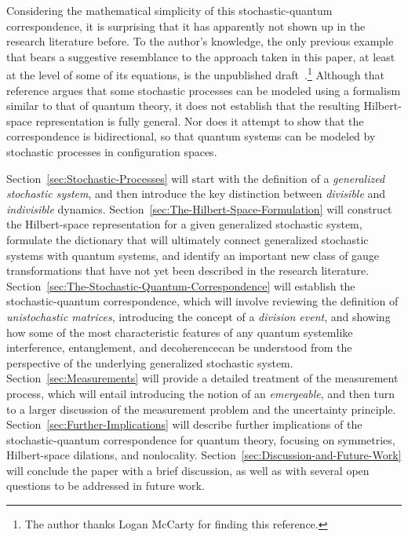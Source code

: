 \documentclass[12pt,english,prl,superscriptaddress,nobibnotes,nofootinbib]{revtex4-2}
\begin{document}
Considering the mathematical simplicity of this stochastic-quantum
correspondence, it is surprising that it has apparently not shown
up in the research literature before. To the author's knowledge, the
only previous example that bears a suggestive resemblance to the approach
taken in this paper, at least at the level of some of its equations,
is the unpublished draft~\citep{Wetterich:2009qrocse}.\footnote{The author thanks Logan McCarty for finding this reference.}
Although that reference argues that some stochastic processes can
be modeled using a formalism similar to that of quantum theory, it
does not establish that the resulting Hilbert-space representation
is fully general. Nor does it attempt to show that the correspondence
is bidirectional, so that quantum systems can be modeled by stochastic
processes in configuration spaces.

Section~\ref{sec:Stochastic-Processes} will start with the definition
of a \emph{generalized stochastic system}, and then introduce the
key distinction between \emph{divisible} and \emph{indivisible}
dynamics. Section~\ref{sec:The-Hilbert-Space-Formulation} will construct
the Hilbert-space representation for a given generalized stochastic
system, formulate the dictionary that will ultimately connect generalized
stochastic systems with quantum systems, and identify an important
new class of gauge transformations that have not yet been described
in the research literature. Section~\ref{sec:The-Stochastic-Quantum-Correspondence}
will establish the stochastic-quantum correspondence, which will involve
reviewing the definition of \emph{unistochastic matrices}, introducing
the concept of a \emph{division event}, and showing how some of the
most characteristic features of any quantum system\textemdash like
interference, entanglement, and decoherence\textemdash can be understood
from the perspective of the underlying generalized stochastic system.
Section~\ref{sec:Measurements} will provide a detailed treatment
of the measurement process, which will entail introducing the notion
of an \emph{emergeable}, and then turn to a larger discussion of
the measurement problem and the uncertainty principle. Section~\ref{sec:Further-Implications}
will describe further implications of the stochastic-quantum correspondence
for quantum theory, focusing on symmetries, Hilbert-space dilations,
and nonlocality. Section~\ref{sec:Discussion-and-Future-Work} will
conclude the paper with a brief discussion, as well as with several
open questions to be addressed in future work.
\end{document}
